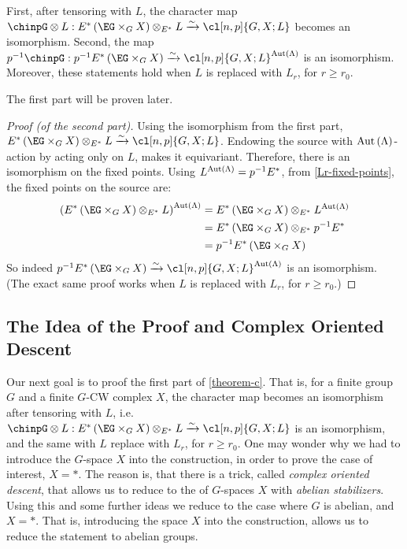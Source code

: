 \begin{theorem}\label{theorem-c}
	First, after tensoring with $L$, the character map
	$\chinpG \otimes L: E^*\left(\EG \times_G X\right) \otimes_{E^*} L \xrightarrow{\sim} \cl[n,p]{G,X; L}$
	becomes an isomorphism.
	Second, the map
	$p^{-1}\chinpG: p^{-1} E^*\left(\EG \times_G X\right) \xrightarrow{\sim} \cl[n,p]{G,X; L}^{\aut \left(\Lambda\right)}$
	is an isomorphism.
	Moreover, these statements hold when $L$ is replaced with $L_r$, for $r \geq r_0$.
\end{theorem}

The first part will be proven later.

\begin{proof}[Proof (of the second part)]
	Using the isomorphism from the first part,
	$E^*\left(\EG \times_G X\right) \otimes_{E^*} L \xrightarrow{\sim} \cl[n,p]{G,X; L}$.
	Endowing the source with $\operatorname{Aut} \left(\Lambda\right)$-action by acting only on $L$, makes it equivariant.
	Therefore, there is an isomorphism on the fixed points.
	Using $L^{\operatorname{Aut} \left(\Lambda\right)} = p^{-1} E^*$, from \ref{Lr-fixed-points}, the fixed points on the source are:
	\begin{align*}
		\left(E^*\left(\EG \times_G X\right) \otimes_{E^*} L\right)^{\aut \left(\Lambda\right)}
		&= E^*\left(\EG \times_G X\right) \otimes_{E^*} L^{\aut \left(\Lambda\right)}\\
		&= E^*\left(\EG \times_G X\right) \otimes_{E^*} p^{-1} E^*\\
		&= p^{-1} E^*\left(\EG \times_G X\right)
	\end{align*}
	So indeed $p^{-1} E^*\left(\EG \times_G X\right) \xrightarrow{\sim} \cl[n,p]{G,X; L}^{\aut \left(\Lambda\right)}$ is an isomorphism.
	(The exact same proof works when $L$ is replaced with $L_r$, for $r \geq r_0$.)
\end{proof}



\subsection{The Idea of the Proof and Complex Oriented Descent}

Our next goal is to proof the first part of \ref{theorem-c}.
That is, for a finite group $G$ and a finite $G$-CW complex $X$, the character map becomes an isomorphism after tensoring with $L$, i.e.
$\chinpG \otimes L: E^*\left(\EG \times_G X\right) \otimes_{E^*} L \xrightarrow{\sim} \cl[n,p]{G,X; L}$
is an isomorphism, and the same with $L$ replace with $L_r$, for $r \geq r_0$.
One may wonder why we had to introduce the $G$-space $X$ into the construction, in order to prove the case of interest, $X = *$.
The reason is, that there is a trick, called \emph{complex oriented descent}, that allows us to reduce to the of $G$-spaces $X$ with \emph{abelian stabilizers}.
Using this and some further ideas we reduce to the case where $G$ is abelian, and $X = *$.
That is, introducing the space $X$ into the construction, allows us to reduce the statement to abelian groups.

